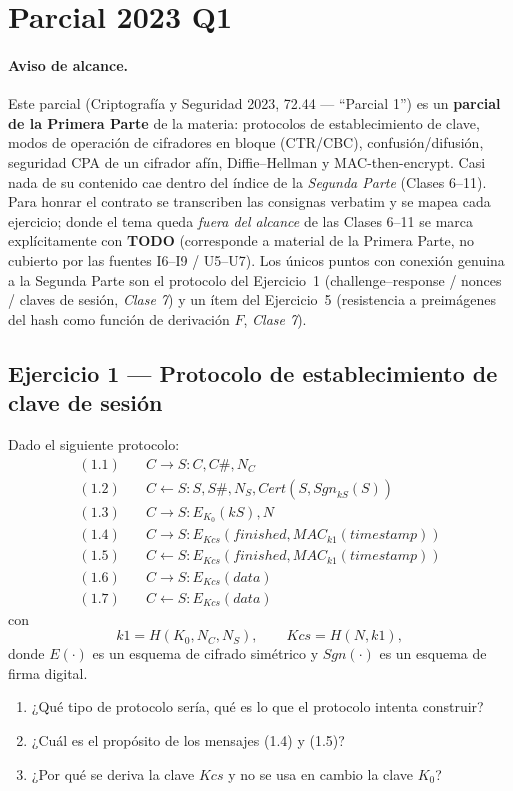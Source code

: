 \section{Parcial 2023 Q1}

\paragraph{Aviso de alcance.} Este parcial (Criptografía y Seguridad 2023, 72.44 — ``Parcial 1'')
es un \textbf{parcial de la Primera Parte} de la materia: protocolos de establecimiento de clave,
modos de operación de cifradores en bloque (CTR/CBC), confusión/difusión, seguridad CPA de un
cifrador afín, Diffie--Hellman y MAC-then-encrypt. Casi nada de su contenido cae dentro del
índice de la \emph{Segunda Parte} (Clases 6--11). Para honrar el contrato se transcriben las
consignas verbatim y se mapea cada ejercicio; donde el tema queda \emph{fuera del alcance} de
las Clases 6--11 se marca explícitamente con \textbf{TODO} (corresponde a material de la Primera
Parte, no cubierto por las fuentes I6--I9 / U5--U7). Los únicos puntos con conexión genuina a la
Segunda Parte son el protocolo del Ejercicio~1 (challenge--response / nonces / claves de sesión,
\emph{Clase 7}) y un ítem del Ejercicio~5 (resistencia a preimágenes del hash como función de
derivación $F$, \emph{Clase 7}).

\subsection{Ejercicio 1 — Protocolo de establecimiento de clave de sesión}

\begin{consigna}
Dado el siguiente protocolo:
\begin{align*}
(1.1)\quad & C \to S : C, C\#, N_C \\
(1.2)\quad & C \leftarrow S : S, S\#, N_S, \mathit{Cert}(S, \mathit{Sgn}_{kS}(S)) \\
(1.3)\quad & C \to S : E_{K_0}(kS), N \\
(1.4)\quad & C \to S : E_{Kcs}(\mathit{finished}, \mathit{MAC}_{k1}(\mathit{timestamp})) \\
(1.5)\quad & C \leftarrow S : E_{Kcs}(\mathit{finished}, \mathit{MAC}_{k1}(\mathit{timestamp})) \\
(1.6)\quad & C \to S : E_{Kcs}(\mathit{data}) \\
(1.7)\quad & C \leftarrow S : E_{Kcs}(\mathit{data})
\end{align*}
con
\[
k1 = H(K_0, N_C, N_S), \qquad Kcs = H(N, k1),
\]
donde $E(\cdot)$ es un esquema de cifrado simétrico y $\mathit{Sgn}(\cdot)$ es un esquema de firma digital.
\begin{enumerate}
\item[a)] ¿Qué tipo de protocolo sería, qué es lo que el protocolo intenta construir?
\item[b)] ¿Cuál es el propósito de los mensajes (1.4) y (1.5)?
\item[c)] ¿Por qué se deriva la clave $Kcs$ y no se usa en cambio la clave $K_0$?
\end{enumerate}
\end{consigna}

